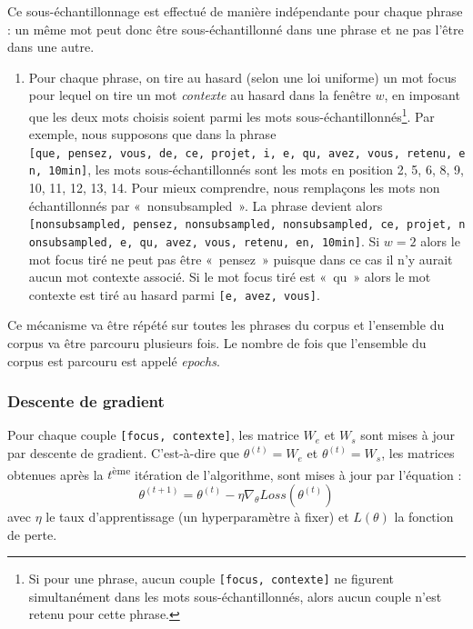 \documentclass[11pt,french,french]{article}
\providecommand{\tightlist}{%
  \setlength{\parskip}{0pt}
  }
\let\rmarkdownfootnote\footnote%
\def\footnote{\protect\rmarkdownfootnote}
\begin{document}
Ce sous-échantillonnage est effectué de manière indépendante pour chaque
phrase : un même mot peut donc être sous-échantillonné dans une phrase
et ne pas l'être dans une autre.

\begin{enumerate}
\def\labelenumi{\arabic{enumi}.}
\setcounter{enumi}{1}
\tightlist
\item
  Pour chaque phrase, on tire au hasard (selon une loi uniforme) un mot
  focus pour lequel on tire un mot \emph{contexte} au hasard dans la
  fenêtre \(w\), en imposant que les deux mots choisis soient parmi les
  mots sous-échantillonnés\footnote{Si pour une phrase, aucun couple
    \texttt{{[}focus,\ contexte{]}} ne figurent simultanément dans les
    mots sous-échantillonnés, alors aucun couple n'est retenu pour cette
    phrase.}. Par exemple, nous supposons que dans la phrase
  \texttt{{[}que,\ pensez,\ vous,\ de,\ ce,\ projet,\ i,\ e,\ qu,\ avez,\ vous,\ retenu,\ en,\ 10min{]}},
  les mots sous-échantillonnés sont les mots en position 2, 5, 6, 8, 9,
  10, 11, 12, 13, 14. Pour mieux comprendre, nous remplaçons les mots
  non échantillonnés par «~nonsubsampled~». La phrase devient alors
  \texttt{{[}nonsubsampled,\ pensez,\ nonsubsampled,\ nonsubsampled,\ ce,\ projet,\ nonsubsampled,\ e,\ qu,\ avez,\ vous,\ retenu,\ en,\ 10min{]}}.
  Si \(w=2\) alors le mot focus tiré ne peut pas être «~pensez~» puisque
  dans ce cas il n'y aurait aucun mot contexte associé. Si le mot focus
  tiré est «~qu~» alors le mot contexte est tiré au hasard parmi
  \texttt{{[}e,\ avez,\ vous{]}}.
\end{enumerate}

Ce mécanisme va être répété sur toutes les phrases du corpus et
l'ensemble du corpus va être parcouru plusieurs fois. Le nombre de fois
que l'ensemble du corpus est parcouru est appelé \emph{epochs}.

\subsubsection{Descente de gradient}\label{subsec:descentedegradient}

Pour chaque couple \texttt{{[}focus,\ contexte{]}}, les matrice \(W_e\)
et \(W_s\) sont mises à jour par descente de gradient. C'est-à-dire que
\(\theta^{(t)} = W_e\) et \(\theta^{(t)} = W_s\), les matrices obtenues
après la \(t\)\textsuperscript{ème} itération de l'algorithme, sont
mises à jour par l'équation :
\[\theta^{(t+1)} = \theta^{(t)} - \eta \nabla_\theta Loss(\theta^{(t)})\]
avec \(\eta\) le taux d'apprentissage (un hyperparamètre à fixer) et
\(L(\theta)\) la fonction de perte.
\end{document}
